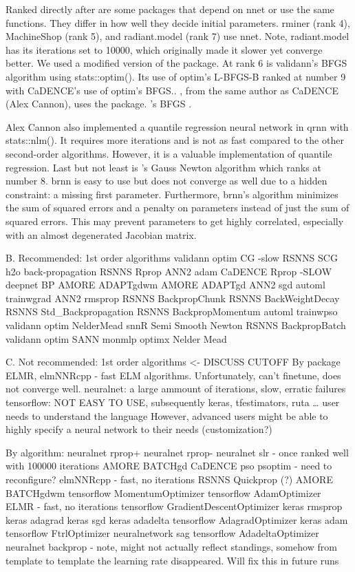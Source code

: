 Ranked directly after are some packages that depend on nnet or use the
same functions. They differ in how well they decide initial parameters.
rminer (rank 4), MachineShop (rank 5), and radiant.model (rank 7) use
nnet. Note, radiant.model has its iterations set to 10000, which
originally made it slower yet converge better. We used a modified
version of the package. At rank 6 is validann's BFGS algorithm using
stats::optim(). Its use of optim's L-BFGS-B ranked at number 9 with
CaDENCE's use of optim's BFGS.. , from the same author
as CaDENCE (Alex Cannon), uses the package. 's BFGS
\citep{R-optimx}.

Alex Cannon also implemented a quantile regression neural network in
qrnn with stats::nlm(). It requires more iterations and is not as fast
compared to the other second-order algorithms. However, it is a valuable
implementation of quantile regression. Last but not least is
's Gauss Newton algorithm which ranks at number 8. brnn is
easy to use but does not converge as well due to a hidden constraint: a
missing first parameter. Furthermore, brnn's algorithm minimizes the sum
of squared errors and a penalty on parameters instead of just the sum of
squared errors. This may prevent parameters to get highly correlated,
especially with an almost degenerated Jacobian matrix.

B. Recommended: 1st order algorithms validann optim CG -slow RSNNS SCG
h2o back-propagation RSNNS Rprop ANN2 adam CaDENCE Rprop -SLOW deepnet
BP AMORE ADAPTgdwm AMORE ADAPTgd ANN2 sgd automl trainwgrad ANN2 rmsprop
RSNNS BackpropChunk RSNNS BackWeightDecay RSNNS Std\_Backpropagation
RSNNS BackpropMomentum automl trainwpso validann optim NelderMead snnR
Semi Smooth Newton RSNNS BackpropBatch validann optim SANN monmlp optimx
Nelder Mead

C. Not recommended: 1st order algorithms \textless- DISCUSS CUTOFF By
package ELMR, elmNNRcpp - fast ELM algorithms. Unfortunately, can't
finetune, does not converge well. neuralnet: a large ammount of
iterations, slow, erratic failures tensorflow: NOT EASY TO USE,
subsequently keras, tfestimators, ruta \ldots{} user needs to understand
the language However, advanced users might be able to highly specify a
neural network to their needs (customization?)

By algorithm: neuralnet rprop+ neuralnet rprop- neuralnet slr - once
ranked well with 100000 iterations AMORE BATCHgd CaDENCE pso psoptim -
need to reconfigure? elmNNRcpp - fast, no iterations RSNNS Quickprop (?)
AMORE BATCHgdwm tensorflow MomentumOptimizer tensorflow AdamOptimizer
ELMR - fast, no iterations tensorflow GradientDescentOptimizer keras
rmsprop keras adagrad keras sgd keras adadelta tensorflow
AdagradOptimizer keras adam tensorflow FtrlOptimizer neuralnetwork sag
tensorflow AdadeltaOptimizer neuralnet backprop - note, might not
actually reflect standings, somehow from template to template the
learning rate disappeared. Will fix this in future runs

